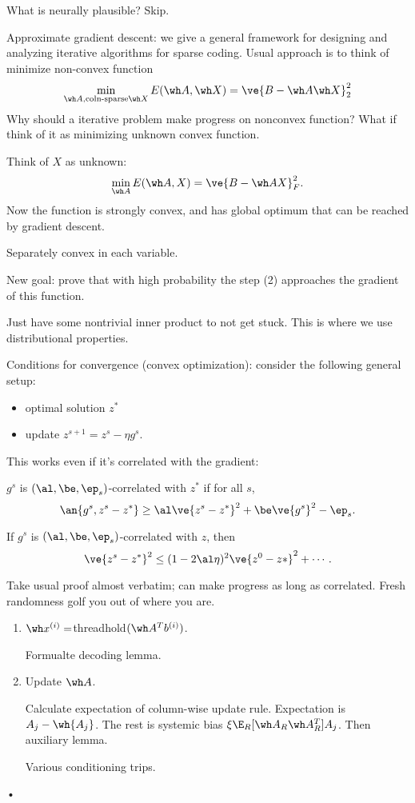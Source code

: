 What is neurally plausible? Skip.

Approximate gradient descent: we give a general framework for designing and analyzing iterative algorithms for sparse coding. 
Usual approach is to think of minimize non-convex function
\[
\min_{\wh A, \text{coln-sparse} \wh X} E(\wh A, \wh X) = \ve{B-\wh A\wh X}_2^2
\]
Why should a iterative problem make progress on nonconvex function? What if think of it as minimizing unknown convex function.

Think of $X$ as unknown: 
\[
\min_{\wh A} E(\wh A, X)=\ve{B-\wh AX}_F^2. 
\]
Now the function is strongly convex, and has global optimum that can be reached by gradient descent. 

Separately convex in each variable. 

New goal: prove that with high probability the step (2) approaches the gradient of this function.

Just have some nontrivial inner product to not get stuck. This is where we use distributional properties.


Conditions for convergence (convex optimization): consider the following general setup:
\begin{itemize}
\item
optimal solution $z^*$
\item
update $z^{s+1}=z^s-\eta g^s$.
\end{itemize}
This works even if it's correlated with the gradient:
\begin{df}
$g^s$  is $(\al,\be,\ep_s)$-correlated with $z^*$ if for all $s$, 
\[
\an{g^s,z^s-z^*}\ge \al \ve{z^s-z^*}^2 + \be\ve{g^s}^2 -\ep_s.
\]
\end{df}
\begin{thm}
If $g^s$ is $(\al,\be,\ep_s)$-correlated with $z$, then
\[
\ve{z^s-z^*}^2 \le (1-2\al \eta)^2\ve{z^0-z*}^2 + \cdots.
\]
\end{thm}
Take usual proof almost verbatim; can make progress as long as correlated. 
Fresh randomness golf you out of where you are.

\begin{enumerate}
\item
$\wh x^{(i)}=$threadhold$(\wh A^Tb^{(i)})$. 

Formualte decoding lemma. 
\item
Update $\wh A$.

Calculate expectation of column-wise update rule. Expectation is $A_j-\wh{A_j}$. The rest is systemic bias $\xi \E_R[\wh A_R\wh A_R^T]A_j$.
Then auxiliary lemma. 

Various conditioning trips.
\end{enumerate}•

